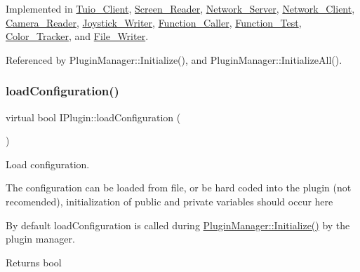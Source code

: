 Implemented in \hyperlink{class_tuio___client_a170015752bb0bb4c7815a08150a42620}{Tuio\+\_\+\+Client}, \hyperlink{class_screen___reader_ab6219f6991a1574fb20b5f96953da62e}{Screen\+\_\+\+Reader}, \hyperlink{class_network___server_a9ddcc321be18d2a6c28f51a3b94983ff}{Network\+\_\+\+Server}, \hyperlink{class_network___client_ae7279167c7343c8a8304f55a5f24c802}{Network\+\_\+\+Client}, \hyperlink{class_camera___reader_a752286c32bea93608d0d23d1d4b3f0ed}{Camera\+\_\+\+Reader}, \hyperlink{class_joystick___writer_a3b341bb82658ee52172b22d90a18628f}{Joystick\+\_\+\+Writer}, \hyperlink{class_function___caller_a6499f7bae56266b6372351da555f316f}{Function\+\_\+\+Caller}, \hyperlink{class_function___test_afffb9c39e5b1178774cc3a1191124409}{Function\+\_\+\+Test}, \hyperlink{class_color___tracker_a289707cab18e4af7f1353ee859da2fb5}{Color\+\_\+\+Tracker}, and \hyperlink{class_file___writer_a7450494cfffa8ba1635f9121dfd955de}{File\+\_\+\+Writer}.



Referenced by Plugin\+Manager\+::\+Initialize(), and Plugin\+Manager\+::\+Initialize\+All().

\mbox{\label{class_i_plugin_a418cff309436d3a15d9a4ce7369db6dd}} 
\subsubsection{\texorpdfstring{load\+Configuration()}{loadConfiguration()}}
{\footnotesize\ttfamily virtual bool I\+Plugin\+::load\+Configuration (\begin{DoxyParamCaption}{ }\end{DoxyParamCaption})\hspace{0.3cm}{\ttfamily [pure virtual]}}



Load configuration. 

The configuration can be loaded from file, or be hard coded into the plugin (not recomended), initialization of public and private variables should occur here

By default load\+Configuration is called during \hyperlink{class_plugin_manager_a956e653b7db36da9d034b4a93c8308d5}{Plugin\+Manager\+::\+Initialize()} by the plugin manager.

\begin{DoxyReturn}{Returns}
bool 
\end{DoxyReturn}


